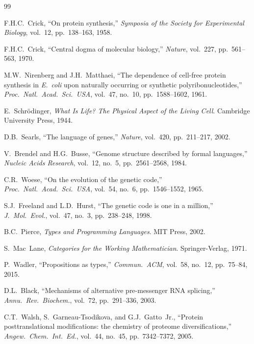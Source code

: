 \documentclass[12pt,a4paper]{article}
\theoremstyle{definition}
\begin{document}
\newpage
\begin{thebibliography}{99}

F.H.C.\ Crick,
``On protein synthesis,''
\textit{Symposia of the Society for Experimental Biology}, vol.\ 12, pp.\ 138--163, 1958.

F.H.C.\ Crick,
``Central dogma of molecular biology,''
\textit{Nature}, vol.\ 227, pp.\ 561--563, 1970.

M.W.\ Nirenberg and J.H.\ Matthaei,
``The dependence of cell-free protein synthesis in \textit{E.\ coli} upon naturally occurring or synthetic polyribonucleotides,''
\textit{Proc.\ Natl.\ Acad.\ Sci.\ USA}, vol.\ 47, no.\ 10, pp.\ 1588--1602, 1961.

E.\ Schr\"{o}dinger,
\textit{What Is Life? The Physical Aspect of the Living Cell}.
Cambridge University Press, 1944.

D.B.\ Searls,
``The language of genes,''
\textit{Nature}, vol.\ 420, pp.\ 211--217, 2002.

V.\ Brendel and H.G.\ Busse,
``Genome structure described by formal languages,''
\textit{Nucleic Acids Research}, vol.\ 12, no.\ 5, pp.\ 2561--2568, 1984.

C.R.\ Woese,
``On the evolution of the genetic code,''
\textit{Proc.\ Natl.\ Acad.\ Sci.\ USA}, vol.\ 54, no.\ 6, pp.\ 1546--1552, 1965.

S.J.\ Freeland and L.D.\ Hurst,
``The genetic code is one in a million,''
\textit{J.\ Mol.\ Evol.}, vol.\ 47, no.\ 3, pp.\ 238--248, 1998.

B.C.\ Pierce,
\textit{Types and Programming Languages}.
MIT Press, 2002.

S.\ Mac~Lane,
\textit{Categories for the Working Mathematician}.
Springer-Verlag, 1971.

P.\ Wadler,
``Propositions as types,''
\textit{Commun.\ ACM}, vol.\ 58, no.\ 12, pp.\ 75--84, 2015.

D.L.\ Black,
``Mechanisms of alternative pre-messenger RNA splicing,''
\textit{Annu.\ Rev.\ Biochem.}, vol.\ 72, pp.\ 291--336, 2003.

C.T.\ Walsh, S.\ Garneau-Tsodikova, and G.J.\ Gatto~Jr.,
``Protein posttranslational modifications: the chemistry of proteome diversifications,''
\textit{Angew.\ Chem.\ Int.\ Ed.}, vol.\ 44, no.\ 45, pp.\ 7342--7372, 2005.


\end{thebibliography}
\end{document}
